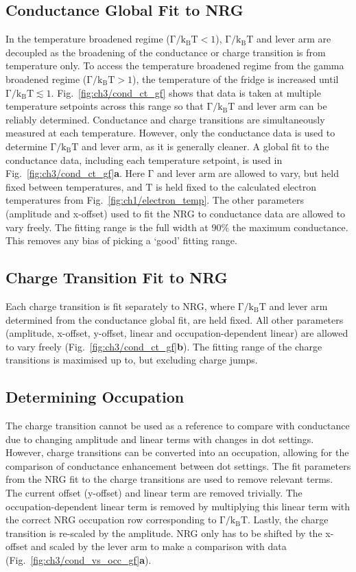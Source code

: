 \subsection{Conductance Global Fit to NRG}
In the temperature broadened regime ($\mathrm{\Gamma/k_BT} < 1$), $\mathrm{\Gamma/k_BT}$ and lever arm are decoupled as the broadening of the conductance or charge transition is from temperature only. To access the temperature broadened regime from the gamma broadened regime ($\mathrm{\Gamma/k_BT} > 1$), the temperature of the fridge is increased until $\mathrm{\Gamma/k_BT} \lesssim 1$. Fig.~\ref{fig:ch3/cond_ct_gf} shows that data is taken at multiple temperature setpoints across this range so that $\mathrm{\Gamma/k_BT}$ and lever arm can be reliably determined. Conductance and charge transitions are simultaneously measured at each temperature. However, only the conductance data is used to determine $\mathrm{\Gamma/k_BT}$ and lever arm, as it is generally cleaner. A global fit to the conductance data, including each temperature setpoint, is used in Fig.~\ref{fig:ch3/cond_ct_gf}\textbf{a}. Here $\mathrm{\Gamma}$ and lever arm are allowed to vary, but held fixed between temperatures, and $\mathrm{T}$ is held fixed to the calculated electron temperatures from Fig.~\ref{fig:ch1/electron_temp}. The other parameters (amplitude and x-offset) used to fit the NRG to conductance data are allowed to vary freely.
The fitting range is the full width at $90\%$ the maximum conductance. This removes any bias of picking a `good' fitting range. 

\subsection{Charge Transition Fit to NRG}
Each charge transition is fit separately to NRG, where $\mathrm{\Gamma/k_BT}$ and lever arm determined from the conductance global fit, are held fixed. All other parameters (amplitude, x-offset, y-offset, linear and occupation-dependent linear) are allowed to vary freely (Fig.~\ref{fig:ch3/cond_ct_gf}\textbf{b}). The fitting range of the charge transitions is maximised up to, but excluding charge jumps.


\subsection{Determining Occupation}


The charge transition cannot be used as a reference to compare with conductance due to changing amplitude and linear terms with changes in dot settings. However, charge transitions can be converted into an occupation, allowing for the comparison of conductance enhancement between dot settings. The fit parameters from the NRG fit to the charge transitions are used to remove relevant terms. The current offset (y-offset) and linear term are removed trivially. The occupation-dependent linear term is removed by multiplying this linear term with the correct NRG occupation row corresponding to $\mathrm{\Gamma/k_BT}$. Lastly, the charge transition is re-scaled by the amplitude. NRG only has to be shifted by the x-offset and scaled by the lever arm to make a comparison with data (Fig.~\ref{fig:ch3/cond_vs_occ_gf}\textbf{a}).


